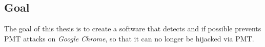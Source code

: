 \subsection{Goal}
The goal of this thesis is to create a software that detects and if possible prevents \gls{PMT} attacks on \emph{Google Chrome}, so that it can no longer be hijacked via \gls{PMT}.